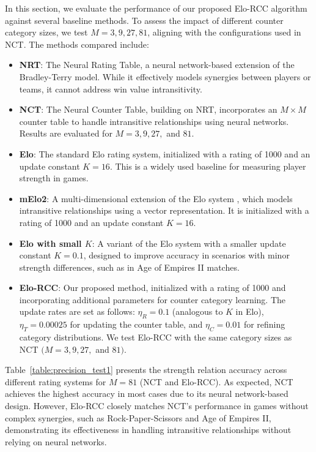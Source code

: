 In this section, we evaluate the performance of our proposed Elo-RCC algorithm against several baseline methods. To assess the impact of different counter category sizes, we test $M = 3, 9, 27, 81$, aligning with the configurations used in NCT. The methods compared include:

\begin{itemize}
    \item \textbf{NRT}: The Neural Rating Table, a neural network-based extension of the Bradley-Terry model. While it effectively models synergies between players or teams, it cannot address win value intransitivity.
    
    \item \textbf{NCT}: The Neural Counter Table, building on NRT, incorporates an $M \times M$ counter table to handle intransitive relationships using neural networks. Results are evaluated for $M = 3, 9, 27,$ and $81$.
    
    \item \textbf{Elo}: The standard Elo rating system, initialized with a rating of 1000 and an update constant $K = 16$. This is a widely used baseline for measuring player strength in games.
    
    \item \textbf{mElo2}: A multi-dimensional extension of the Elo system \citep{m_elo}, which models intransitive relationships using a vector representation. It is initialized with a rating of 1000 and an update constant $K = 16$.
    
    \item \textbf{Elo with small $K$}: A variant of the Elo system with a smaller update constant $K = 0.1$, designed to improve accuracy in scenarios with minor strength differences, such as in Age of Empires II matches.
    
    \item \textbf{Elo-RCC}: Our proposed method, initialized with a rating of 1000 and incorporating additional parameters for counter category learning. The update rates are set as follows: $\eta_R = 0.1$ (analogous to $K$ in Elo), $\eta_T = 0.00025$ for updating the counter table, and $\eta_C = 0.01$ for refining category distributions. We test Elo-RCC with the same category sizes as NCT $( M = 3, 9, 27,$ and $81)$.
\end{itemize}

Table~\ref{table:precision_test1} presents the strength relation accuracy across different rating systems for $M = 81$ (NCT and Elo-RCC). As expected, NCT achieves the highest accuracy in most cases due to its neural network-based design. However, Elo-RCC closely matches NCT's performance in games without complex synergies, such as Rock-Paper-Scissors and Age of Empires II, demonstrating its effectiveness in handling intransitive relationships without relying on neural networks.

